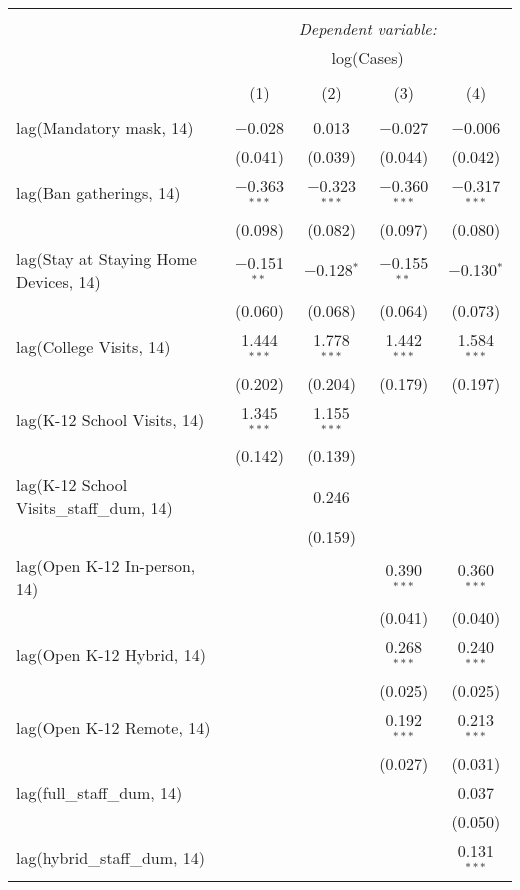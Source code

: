 \begin{tabular}{@{\extracolsep{1pt}}lcccc} 
\\[-1.8ex]\hline 
\hline \\[-1.8ex] 
 & \multicolumn{4}{c}{\textit{Dependent variable:}} \\ 
\cline{2-5} 
 & \multicolumn{4}{c}{log(Cases)} \\ 
\\[-1.8ex] & (1) & (2) & (3) & (4)\\ 
\hline \\[-1.8ex] 
 lag(Mandatory mask, 14) & $-$0.028 & 0.013 & $-$0.027 & $-$0.006 \\ 
  & (0.041) & (0.039) & (0.044) & (0.042) \\ 
  lag(Ban gatherings, 14) & $-$0.363$^{***}$ & $-$0.323$^{***}$ & $-$0.360$^{***}$ & $-$0.317$^{***}$ \\ 
  & (0.098) & (0.082) & (0.097) & (0.080) \\ 
  lag(Stay at Staying Home Devices, 14) & $-$0.151$^{**}$ & $-$0.128$^{*}$ & $-$0.155$^{**}$ & $-$0.130$^{*}$ \\ 
  & (0.060) & (0.068) & (0.064) & (0.073) \\ 
  lag(College Visits, 14) & 1.444$^{***}$ & 1.778$^{***}$ & 1.442$^{***}$ & 1.584$^{***}$ \\ 
  & (0.202) & (0.204) & (0.179) & (0.197) \\ 
  lag(K-12 School Visits, 14) & 1.345$^{***}$ & 1.155$^{***}$ &  &  \\ 
  & (0.142) & (0.139) &  &  \\ 
  lag(K-12 School Visits\_staff\_dum, 14) &  & 0.246 &  &  \\ 
  &  & (0.159) &  &  \\ 
  lag(Open K-12 In-person, 14) &  &  & 0.390$^{***}$ & 0.360$^{***}$ \\ 
  &  &  & (0.041) & (0.040) \\ 
  lag(Open K-12 Hybrid, 14) &  &  & 0.268$^{***}$ & 0.240$^{***}$ \\ 
  &  &  & (0.025) & (0.025) \\ 
  lag(Open K-12 Remote, 14) &  &  & 0.192$^{***}$ & 0.213$^{***}$ \\ 
  &  &  & (0.027) & (0.031) \\ 
  lag(full\_staff\_dum, 14) &  &  &  & 0.037 \\ 
  &  &  &  & (0.050) \\ 
  lag(hybrid\_staff\_dum, 14) &  &  &  & 0.131$^{***}$ \\ 

\end{tabular}
